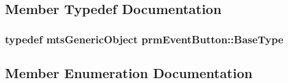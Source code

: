 \subsection{Member Typedef Documentation}
\hypertarget{classprm_event_button_ad7f93b9f9585c48633382b39d118c151}{}
\subsubsection[{Base\+Type}]{\setlength{\rightskip}{0pt plus 5cm}typedef {\bf mts\+Generic\+Object} {\bf prm\+Event\+Button\+::\+Base\+Type}}\label{classprm_event_button_ad7f93b9f9585c48633382b39d118c151}


\subsection{Member Enumeration Documentation}
\hypertarget{classprm_event_button_ad25147a00b664a6df0de483dad956b0b}{}
